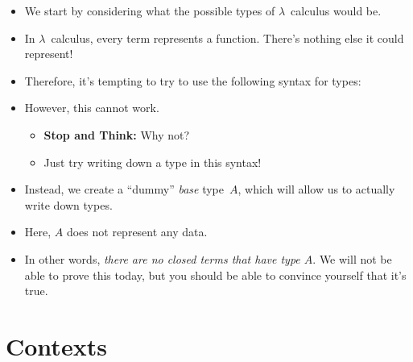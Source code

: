 \documentclass{lecturenotes}
\begin{document}
\begin{itemize}
\item We start by considering what the possible types of $\lambda$~calculus would be.
\item In $\lambda$~calculus, every term represents a function.
  There's nothing else it could represent!
\item Therefore, it's tempting to try to use the following syntax for types:
  \begin{syntax}
    \category[Types]{\tau} 
  \end{syntax}
\item However, this cannot work.
  \begin{itemize}
  \item \textbf{Stop and Think:} Why not?
  \item Just try writing down a type in this syntax!
  \end{itemize}
\item Instead, we create a ``dummy'' \emph{base} type~$A$, which will allow us to actually write down types.
  \begin{syntax}
    \category[Types]{\tau}  
  \end{syntax}
\item Here, $A$ does not represent any data.
\item In other words, \emph{there are no closed terms that have type $A$}.
  We will not be able to prove this today, but you should be able to convince yourself that it's true.
\end{itemize}

\section{Contexts}
\label{sec:contexts}
\end{document}
